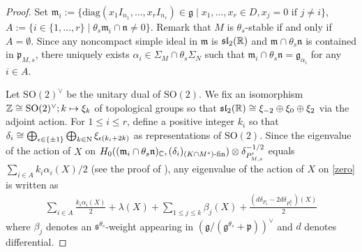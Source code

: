 \documentclass[11pt,letterpaper]{amsart}
\newcommand{\SO}{{\mathrm{SO}}}
\renewcommand{\a}{\alpha}
\renewcommand{\b}{\beta}
\renewcommand{\l}{\lambda}
\newcommand{\x}{\xi}
\newcommand{\fg}{\mathfrak{g}}
\newcommand{\fm}{\mathfrak{m}}
\newcommand{\fn}{\mathfrak{n}}
\newcommand{\fp}{\mathfrak{p}}
\newcommand{\fs}{\mathfrak{s}}
\def\sl{\mathfrak{sl}}
\def\d{\delta}
\def\e{\epsilon}
\def\diag{\mathrm{diag}}
\theoremstyle{plain}
\numberwithin{equation}{section}
\begin{document}
\begin{proof}
Set $\fm_i:=\{\diag(x_1I_{n_1},\ldots,x_rI_{n_r})\in\fg\mid x_1,\ldots,x_r\in D, x_j=0 \text{ if $j\neq i$}\}$, $A:=\{i\in \{1,\ldots,r\}\mid \theta_s\fm_i\cap\fn\neq 0\}$. 
Remark that $M$ is $\theta_s$-stable if and only if $A=\emptyset$. 
Since any noncompact simple ideal in $\fm$ is $\sl_2(\BR)$ and $\fm\cap\theta_s\fn$ is contained in $\fp_{M,s}$, there uniquely exists $\a_i\in\Sigma_M\cap\theta_s\Sigma_N$ such that $\fm_i\cap\theta_s\fn=\fg_{\a_i}$ for any $i\in A$. 

Let $\SO(2)^{\vee}$ be the unitary dual of $\SO(2)$. 
We fix an isomorphism $\BZ\cong\SO(2)^{\vee}; k\mapsto \x_k$ of topological groups so that $\sl_2(\BR)\cong \x_{-2}\oplus\x_0\oplus\x_2$ via the adjoint action.
For $1\le i\le r$, define a positive integer $k_i$ so that 
$\delta_i\cong\bigoplus_{\e\in\{\pm1\}}\bigoplus_{k\in\N}\x_{\e(k_i+2k)}$ as representations of $\SO(2)$.
Since the eigenvalue of the action of $X$ on $H_0((\fm_i\cap\theta_s\fn)_{\BC},(\delta_i)_{(K\cap M^s)\text{-fin}})\otimes \d_{P'_{M,  s}}^{-1/2}$ equals $\sum_{i\in A}k_i\a_i(X)/2$ (see the proof of \cite[Proof of Theorem 5.8]{ST}), 
any eigenvalue of the action of $X$ on \eqref{zero} is written as 
    \begin{align}\label{wt}
    \sum_{i\in A}\frac{k_i\a_i(X)}{2}+\l(X)%
    +\sum_{1\le j\le k}\b_j(X)+\frac{(d\d_{P_s}-2d\d_{P_s^{\theta_s}})(X)}{2}%
    \end{align}
where $\b_j$ denotes an $\fs^{\theta_s}$-weight appearing in $(\fg/(\fg^{\theta_s}+\fp))^{\vee}$ and $d$ denotes differential. 


\end{proof}
\end{document}
